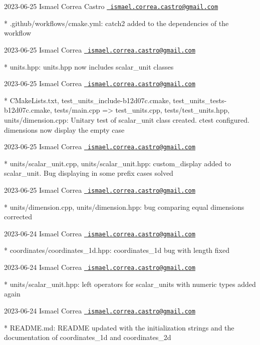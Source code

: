  2023-\/06-\/25 Ismael Correa Castro \href{mailto:ismael.correa.castro@gmail.com}{\texttt{ ismael.\+correa.\+castro@gmail.\+com}} \begin{DoxyVerb}* .github/workflows/cmake.yml: catch2 added to the dependencies of
the workflow
\end{DoxyVerb}
 2023-\/06-\/25 Ismael Correa \href{mailto:ismael.correa.castro@gmail.com}{\texttt{ ismael.\+correa.\+castro@gmail.\+com}} \begin{DoxyVerb}* units.hpp: units.hpp now includes scalar_unit classes
\end{DoxyVerb}
 2023-\/06-\/25 Ismael Correa \href{mailto:ismael.correa.castro@gmail.com}{\texttt{ ismael.\+correa.\+castro@gmail.\+com}} \begin{DoxyVerb}* CMakeLists.txt, test_units_include-b12d07c.cmake,
test_units_tests-b12d07c.cmake, tests/{main.cpp => test_units.cpp},
tests/test_units.hpp, units/dimension.cpp: Unitary test of
scalar_unit class created. ctest configured. dimensions now display
the empty case
\end{DoxyVerb}
 2023-\/06-\/25 Ismael Correa \href{mailto:ismael.correa.castro@gmail.com}{\texttt{ ismael.\+correa.\+castro@gmail.\+com}} \begin{DoxyVerb}* units/scalar_unit.cpp, units/scalar_unit.hpp: custom_display added
to scalar_unit. Bug displaying in some prefix cases solved
\end{DoxyVerb}
 2023-\/06-\/25 Ismael Correa \href{mailto:ismael.correa.castro@gmail.com}{\texttt{ ismael.\+correa.\+castro@gmail.\+com}} \begin{DoxyVerb}* units/dimension.cpp, units/dimension.hpp: bug comparing equal
dimensions corrected
\end{DoxyVerb}
 2023-\/06-\/24 Ismael Correa \href{mailto:ismael.correa.castro@gmail.com}{\texttt{ ismael.\+correa.\+castro@gmail.\+com}} \begin{DoxyVerb}* coordinates/coordinates_1d.hpp: coordinates_1d bug with length
fixed
\end{DoxyVerb}
 2023-\/06-\/24 Ismael Correa \href{mailto:ismael.correa.castro@gmail.com}{\texttt{ ismael.\+correa.\+castro@gmail.\+com}} \begin{DoxyVerb}* units/scalar_unit.hpp: left operators for scalar_units with
numeric types added again
\end{DoxyVerb}
 2023-\/06-\/24 Ismael Correa \href{mailto:ismael.correa.castro@gmail.com}{\texttt{ ismael.\+correa.\+castro@gmail.\+com}} \begin{DoxyVerb}* README.md: README updated with the initialization strings and the
documentation of coordinates_1d and coordinates_2d
\end{DoxyVerb}
